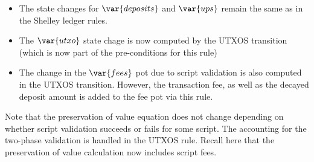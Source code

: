 \begin{itemize}
  \item The state changes for $\var{deposits}$ and $\var{ups}$ remain
  the same as in the Shelley ledger rules.

  \item The $\var{utxo}$ state chage is now computed by the UTXOS transition
  (which is now part of the pre-conditions for this rule)

  \item The change in the $\var{fees}$ pot due to script validation is
  also computed in the UTXOS transition. However, the transaction fee, as well
  as the decayed deposit amount is added to the fee pot via this rule.

\end{itemize}

  Note that the preservation of value equation does not change depending on
  whether script validation succeeds or
  fails for some script. The accounting for the two-phase validation
  is handled in the UTXOS rule. Recall here that the preservation of value
  calculation now includes script fees.


